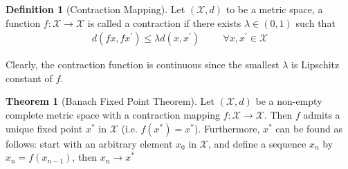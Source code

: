 \documentclass[a4paper]{article}
\theoremstyle{definition}
\newtheorem{defn}{Definition}[section]
\newtheorem{theo}{Theorem}[section]
\begin{document}
\begin{defn}[Contraction Mapping]
Let $(\mathcal{X}, d)$ to be a metric space, a function $f: \mathcal{X} \rightarrow \mathcal{X}$ is called a contraction if there exists $\lambda \in (0,1)$ such that
\begin{align*}
d(fx, fx^{'}) \leq \lambda d(x, x^{'}) \hspace{1cm} \forall x, x^{'} \in \mathcal{X}
\end{align*}
\end{defn}
Clearly, the contraction function is continuous since the smallest $\lambda$ is Lipschitz constant of $f$. 

\begin{theo}[Banach Fixed Point Theorem]
Let $(\mathcal{X}, d)$ be a non-empty complete metric space with a contraction mapping $f: \mathcal{X} \rightarrow \mathcal{X}$. Then $f$ admits a unique fixed point $x^{*}$ in $\mathcal{X}$ (i.e. $f(x^{*}) = x^{*}$). Furthermore, $x^*$ can be found as follows: start with an arbitrary element $x_0$ in $\mathcal{X}$, and define a sequence ${x_n}$ by $x_n = f(x_{n-1})$, then $x_n \rightarrow x^{*}$
\end{theo}
\end{document}
